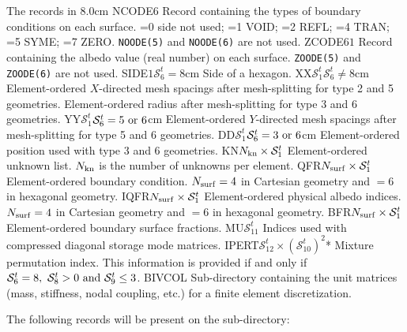 \begin{DescriptionEnregistrement}{The  records in
}{8.0cm}
\IntEnr
  {NCODE}{$6$}
  {Record containing the types of boundary conditions on each surface. =0 side
   not used; =1 VOID; =2 REFL; =4 TRAN; =5 SYME; =7 ZERO. {\tt NOODE(5)} and
   {\tt NOODE(6)} are not used.} 
\RealEnr
  {ZCODE}{$6$}{$1$}
  {Record containing the albedo value (real number) on each surface. {\tt ZOODE(5)}
   and {\tt ZOODE(6)} are not used.} 
\OptRealEnr
  {SIDE}{$1$}{$\mathcal{S}^{t}_{6}=8$}{cm}
  {Side of a hexagon.} 
\OptRealEnr
  {XX}{$\mathcal{S}^{t}_{1}$}{$\mathcal{S}^{t}_{6}\ne 8$}{cm}
  {Element-ordered $X$-directed mesh spacings after mesh-splitting for type 2
   and 5 geometries. Element-ordered radius after mesh-splitting for type 3
   and 6 geometries.} 
\OptRealEnr
  {YY}{$\mathcal{S}^{t}_{1}$}{$\mathcal{S}^{t}_{6}=5 \ {\rm or} \ 6$}{cm}
  {Element-ordered $Y$-directed mesh spacings after mesh-splitting for type 5
   and 6 geometries.} 
\OptRealEnr
  {DD}{$\mathcal{S}^{t}_{1}$}{$\mathcal{S}^{t}_{6}=3 \ {\rm or} \ 6$}{cm}
  {Element-ordered position used with type 3 and 6 geometries.} 
\IntEnr
  {KN}{$N_{\rm kn}\times\mathcal{S}^{t}_{1}$}
  {Element-ordered unknown list. $N_{\rm kn}$ is the number of unknowns per element.} 
\RealEnr
  {QFR}{$N_{\rm surf}\times\mathcal{S}^{t}_{1}$}{}
  {Element-ordered boundary condition. $N_{\rm surf}=4$ in Cartesian geometry and $=6$ in hexagonal geometry.} 
\IntEnr
  {IQFR}{$N_{\rm surf}\times\mathcal{S}^{t}_{1}$}
  {Element-ordered physical albedo indices. $N_{\rm surf}=4$ in Cartesian geometry and $=6$ in hexagonal geometry.} 
\RealEnr
  {BFR}{$N_{\rm surf}\times\mathcal{S}^{t}_{1}$}{}
  {Element-ordered boundary surface fractions.} 
\IntEnr
  {MU}{$\mathcal{S}^{t}_{11}$}
  {Indices used with compressed diagonal storage mode matrices.} 
\OptIntEnr
  {IPERT}{$\mathcal{S}^{t}_{12}\times (\mathcal{S}^{t}_{10})^2$}{*}
  {Mixture permutation index. This information is provided if and only if $\mathcal{S}^{t}_{6}=8, \ \mathcal{S}^{t}_{8}>0 \ {\rm and} \
  \mathcal{S}^{t}_{9}\le 3$.} 
\DirEnr
  {BIVCOL}
  {Sub-directory containing the unit matrices (mass, stiffness, nodal coupling,
   etc.) for a finite element discretization.}
\end{DescriptionEnregistrement}

\goodbreak

The following records will be present on the  sub-directory:


